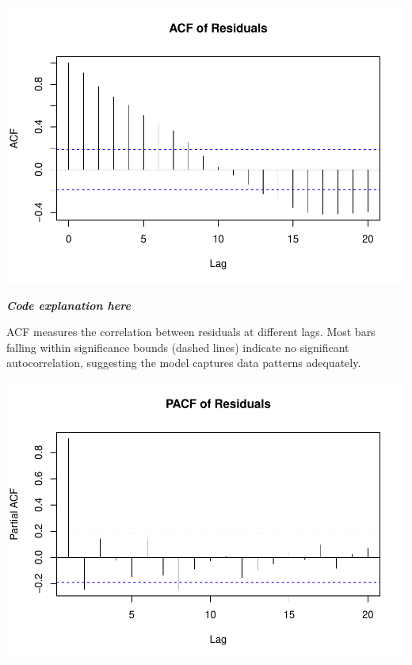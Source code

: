 \documentclass[
]{book}
\newenvironment{Shaded}{\begin{snugshade}}{\end{snugshade}}
\newcommand{\AttributeTok}[1]{\textcolor[rgb]{0.13,0.29,0.53}{#1}}
\newcommand{\FunctionTok}[1]{\textcolor[rgb]{0.13,0.29,0.53}{\textbf{#1}}}
\newcommand{\NormalTok}[1]{#1}
\newcommand{\SpecialCharTok}[1]{\textcolor[rgb]{0.81,0.36,0.00}{\textbf{#1}}}
\newcommand{\StringTok}[1]{\textcolor[rgb]{0.31,0.60,0.02}{#1}}
\begin{document}
\begin{Shaded}
\end{Shaded}

\includegraphics{bookdown-demo_files/figure-latex/unnamed-chunk-25-1.pdf}

\emph{\textbf{Code explanation here}}

ACF measures the correlation between residuals at different lags. Most bars falling within significance bounds (dashed lines) indicate no significant autocorrelation, suggesting the model captures data patterns adequately.

\begin{Shaded}
\end{Shaded}

\includegraphics{bookdown-demo_files/figure-latex/unnamed-chunk-26-1.pdf}
\end{document}
